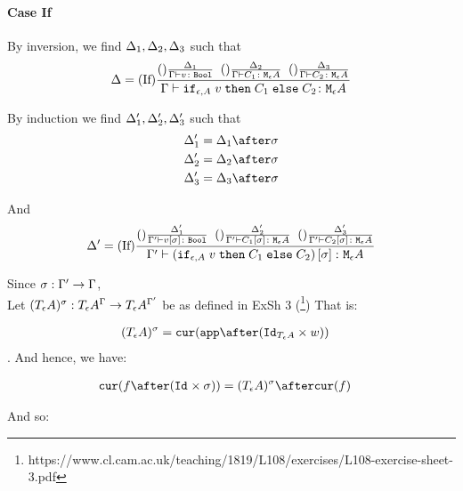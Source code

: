\documentclass{report}
\begin{document}
\paragraph{Case If}


By inversion, we find $\Delta_1, \Delta_2, \Delta_3$ such that
\begin{equation}
    \Delta = (\text{If}) \frac{(\text{}) \frac{\Delta_1}{\Gamma \vdash v \colon \texttt{Bool}}\;\;(\text{}) \frac{\Delta_2}{\Gamma \vdash C_1 \colon \texttt{M}_{\epsilon}{A}}\;\;(\text{}) \frac{\Delta_3}{\Gamma \vdash C_2 \colon \texttt{M}_{\epsilon}{A}}}{\Gamma \vdash \texttt{if}_{\epsilon, A}\; v\; \texttt{then}\; C_1 \;\texttt{else} \; C_2 \colon \texttt{M}_{\epsilon}{A}}
\end{equation}

By induction we find $\Delta_1', \Delta_2', \Delta_3'$ such that 
\begin{align}
    \D_1' &= \D_1\after\si\\
    \D_2' &= \D_2\after\si\\
    \D_3' &= \D_3\after\si\\
\end{align}

And
\begin{equation}
    \Delta' = (\text{If}) \frac{(\text{}) \frac{\Delta_1'}{\Gamma' \vdash v\left[\sigma\right] \colon \texttt{Bool}}\;\;(\text{}) \frac{\Delta_2'}{\Gamma' \vdash C_1\left[\sigma\right] \colon \texttt{M}_{\epsilon}{A}}\;\;(\text{}) \frac{\Delta_3'}{\Gamma' \vdash C_2\left[\sigma\right] \colon \texttt{M}_{\epsilon}{A}}}{\Gamma' \vdash (\texttt{if}_{\epsilon, A}\; v\; \texttt{then}\; C_1 \;\texttt{else} \; C_2)\left[\sigma\right] \colon \texttt{M}_{\epsilon}{A}}
\end{equation}

Since $\sigma: \Gamma' \rightarrow \Gamma$, \\
Let $(T_{\epsilon}{A})^{\sigma}: T_{\epsilon}{A}^{\Gamma}\rightarrow T_{\epsilon}{A}^{\Gamma'}$ be as defined in ExSh 3 (\footnote{https://www.cl.cam.ac.uk/teaching/1819/L108/exercises/L108-exercise-sheet-3.pdf})
That is:

\begin{align}
    (\tea)^{\si} & = \cur{\app\after(\Id{\tea}\times w)}
\end{align}.
And hence, we have:

\begin{align}
    \cur{f\after(\Id{}\times \si)} & = (\tea)^{\si} \after\cur{f}
\end{align}

And so:
\end{document}
